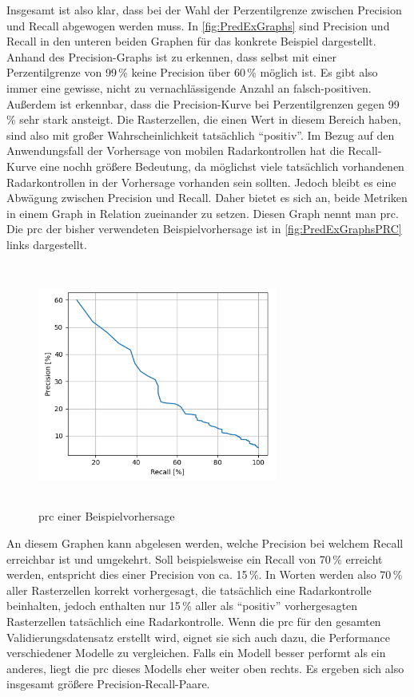 Insgesamt ist also klar, dass bei der Wahl der Perzentilgrenze zwischen Precision und Recall abgewogen werden muss.
In \autoref{fig:PredExGraphs} sind Precision und Recall in den unteren beiden Graphen für das konkrete Beispiel dargestellt.
Anhand des Precision-Graphs ist zu erkennen, dass selbst mit einer Perzentilgrenze von 99\,\% keine Precision über 60\,\% möglich ist.
Es gibt also immer eine gewisse, nicht zu vernachlässigende Anzahl an falsch-positiven.
Außerdem ist erkennbar, dass die Precision-Kurve bei Perzentilgrenzen gegen 99\,\% sehr stark ansteigt.
Die Rasterzellen, die einen Wert in diesem Bereich haben, sind also mit großer Wahrscheinlichkeit tatsächlich "`positiv"'.
Im Bezug auf den Anwendungsfall der Vorhersage von mobilen Radarkontrollen hat die Recall-Kurve eine nochh größere Bedeutung, da möglichst viele tatsächlich vorhandenen Radarkontrollen in der Vorhersage vorhanden sein sollten.
Jedoch bleibt es eine Abwägung zwischen Precision und Recall.
Daher bietet es sich an, beide Metriken in einem Graph in Relation zueinander zu setzen.
Diesen Graph nennt man \acrfull{prc}.
Die \acrshort{prc} der bisher verwendeten Beispielvorhersage ist in \autoref{fig:PredExGraphsPRC} links dargestellt.

\begin{figure}[h]
    \centering
    \includegraphics[width=0.7\textwidth,height=8cm,keepaspectratio=true]{content/images/PredExGraphsPRC.png}
    \caption{\acrfull{prc} einer Beispielvorhersage}
    \label{fig:PredExGraphsPRC}
\end{figure}

An diesem Graphen kann abgelesen werden, welche Precision bei welchem Recall erreichbar ist und umgekehrt.
Soll beispielsweise ein Recall von 70\,\% erreicht werden, entspricht dies einer Precision von ca. 15\,\%.
In Worten werden also 70\,\% aller Rasterzellen korrekt vorhergesagt, die tatsächlich eine Radarkontrolle beinhalten, jedoch enthalten nur 15\,\% aller als "`positiv"' vorhergesagten Rasterzellen tatsächlich eine Radarkontrolle.
Wenn die \acrshort{prc} für den gesamten Validierungsdatensatz erstellt wird, eignet sie sich auch dazu, die Performance verschiedener Modelle zu vergleichen.
Falls ein Modell besser performt als ein anderes, liegt die \acrshort{prc} dieses Modells eher weiter oben rechts.
Es ergeben sich also insgesamt größere Precision-Recall-Paare.

